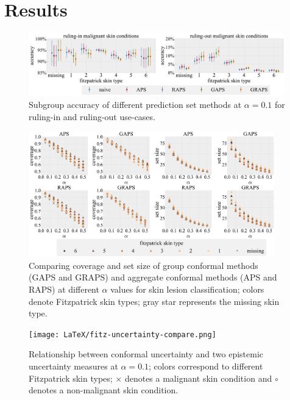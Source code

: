 \documentclass[letterpaper]{article} %
\begin{document}
\section{Results}

\begin{figure}[t]
\centering
\includegraphics[width=0.99\textwidth]{LaTeX/fitz-rule-in-out-subgroup.pdf}
\caption{Subgroup accuracy of different prediction set methods at $\alpha=0.1$ for ruling-in and ruling-out use-cases.}
\label{fig:fitz-use-case}
\end{figure}

\begin{figure}[t]
\centering
\includegraphics[width=0.95\textwidth]{LaTeX/fitz-subgroup-coverage.pdf}
\caption{Comparing coverage and set size of group conformal methods (GAPS and GRAPS) and aggregate conformal methods (APS and RAPS) at different $\alpha$ values for skin lesion classification; colors denote Fitzpatrick skin types; gray star represents the missing skin type.}
\label{fig:fitz-coverage}
\end{figure}

\begin{figure}[t]
\centering
\texttt{[image: LaTeX/fitz-uncertainty-compare.png]}
\caption{Relationship between conformal uncertainty and two epistemic uncertainty measures at $\alpha=0.1$; colors correspond to different Fitzpatrick skin types; $\times$ denotes a malignant skin condition and $\circ$ denotes a non-malignant skin condition.}
\label{fig:epistemic-uncertainty}
\end{figure}
\end{document}
